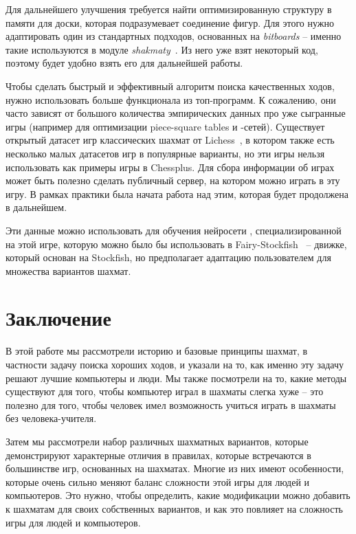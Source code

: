 \documentclass{article}
\begin{document}
Для дальнейшего улучшения требуется найти оптимизированную структуру в памяти для доски,
которая подразумевает соединение фигур.
Для этого нужно адаптировать один из стандартных подходов, основанных на \emph{bitboards} --
именно такие используются в модуле \emph{shakmaty}~\cite{shakmaty-crate}.
Из него уже взят некоторый код,
поэтому будет удобно взять его для дальнейшей работы.

Чтобы сделать быстрый и эффективный алгоритм поиска качественных ходов,
нужно использовать больше функционала из топ-программ.
К сожалению, они часто зависят от большого количества эмпирических данных
про уже сыгранные игры
(например для оптимизации piece-square tables и -сетей).
Существует открытый датасет игр классических шахмат от Lichess~\cite{lichess-dataset},
в котором также есть несколько малых датасетов игр в популярные варианты,
но эти игры нельзя использовать как примеры игры в Chessplus.
Для сбора информации об играх может быть полезно сделать публичный сервер,
на котором можно играть в эту игру.
В рамках практики была начата работа над этим,
которая будет продолжена в дальнейшем.

Эти данные можно использовать для обучения нейросети ,
специализированной на этой игре,
которую можно было бы использовать в Fairy-Stockfish~\cite{fairy-stockfish} --
движке, который основан на Stockfish, но
предполагает адаптацию пользователем для множества вариантов шахмат.

\section{Заключение}

В этой работе мы рассмотрели историю и базовые принципы шахмат,
в частности задачу поиска хороших ходов,
и указали на то, как именно эту задачу решают лучшие компьютеры и люди.
Мы также посмотрели на то, какие методы существуют для того,
чтобы компьютер играл в шахматы слегка хуже -- 
это полезно для того, чтобы человек имел возможность учиться играть в шахматы
без человека-учителя.

Затем мы рассмотрели набор различных шахматных вариантов,
которые демонстрируют характерные отличия в правилах,
которые встречаются в большинстве игр, основанных на шахматах.
Многие из них имеют особенности, 
которые очень сильно меняют баланс сложности
этой игры для людей и компьютеров.
Это нужно, чтобы определить,
какие модификации можно добавить к шахматам
для своих собственных вариантов,
и как это повлияет на сложность игры для людей и компьютеров.
\end{document}
